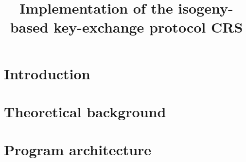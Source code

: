 \documentclass[12pt]{article}
\title{Implementation of the isogeny-based key-exchange protocol CRS}
\author{}
\date{}
\begin{document}
\maketitle
\renewcommand{\contentsname}{Table of content}
\tableofcontents
\newpage

%

\section{Introduction}


\section{Theoretical background}


\section{Program architecture}


%
\end{document}
